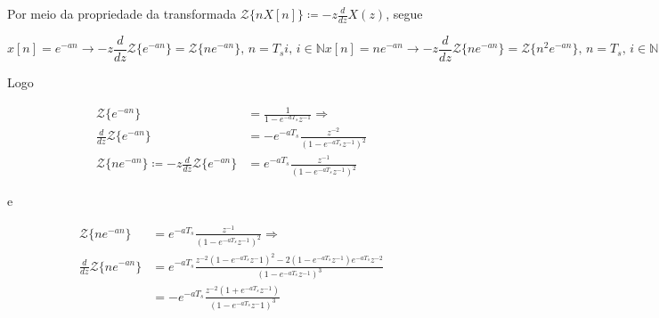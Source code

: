 \begin{enumerate}
        Por meio da propriedade da transformada $\mathcal{Z}\{n X[n]\} \coloneqq -z \frac{d}{dz} X(z)$, segue
        
            \begin{subequations}
                \begin{equation}
                    x[n] = e^{-an} \rightarrow -z \frac{d}{dz} \mathcal{Z}\{e^{-an}\} = \mathcal{Z}\{n e^{-an}\} \mbox{, } n = T_s i \mbox{, } i \in \mathbb{N}
                \end{equation}
                \begin{equation}
                    x[n] = n e^{-an} \rightarrow -z \frac{d}{dz} \mathcal{Z}\{n e^{-an}\} = \mathcal{Z}\{n^2 e^{-an}\} \mbox{, } n = T_s \mbox{, } i \in \mathbb{N}
                \end{equation}
            \end{subequations}
        
        Logo
        
            \begin{equation}
                \begin{split}
                    \mathcal{Z}\{e^{-an}\} & = \frac{1}{1 - e^{-a T_s} z^{-1}} \Rightarrow \\
                    \frac{d}{dz} \mathcal{Z}\{e^{-an}\} & = - e^{-a T_s} \frac{z^{-2}}{(1 - e^{-a T_s} z^{-1})^2} \\
                    \mathcal{Z}\{n e^{-an}\} \coloneqq -z \frac{d}{dz} \mathcal{Z}\{e^{-an}\} & = e^{-a T_s} \frac{z^{-1}}{(1 - e^{-a T_s} z^{-1})^2}
                \end{split}
            \end{equation}
        
        e
        
            \begin{equation}
                \begin{split}
                    \mathcal{Z}\{n e^{-an}\} & = e^{-a T_s} \frac{z^{-1}}{(1 - e^{-a T_s} z^{-1})^2} \Rightarrow \\ \frac{d}{dz} \mathcal{Z}\{n e^{-an}\} & = e^{- a T_s} \frac{z^{-2}(1 - e^{-a T_s} z^-1)^2 - 2(1 - e^{-a T_s} z^{-1}) e^{-a T_s} z^{-2}}{(1 - e^{-a T_s} z^{-1})^3} \\ 
                    & = - e^{-a T_s} \frac{z^{-2} (1 + e^{-a T_s} z^{-1})}{(1 - e^{- a T_s} z^-1)^3}
                \end{split}
            \end{equation}
        

\end{enumerate}
